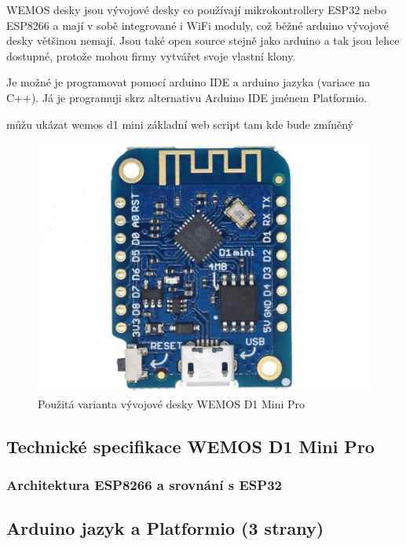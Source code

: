 \oldtext

WEMOS desky jsou vývojové desky co používají mikrokontrollery ESP32 nebo ESP8266 a mají v sobě integrované i WiFi moduly, což běžné arduino vývojové desky většinou nemají. Jsou také open source stejně jako arduino a tak jsou lehce dostupné, protože mohou firmy vytvářet svoje vlastní klony.

Je možné je programovat pomocí arduino IDE a arduino jazyka (variace na C++). Já je programuji skrz alternativu Arduino IDE jménem Platformio.

můžu ukázat wemos d1 mini základní web script tam kde bude zmíněný \cite{NavodNaESPWebServerDratek}


\begin{figure}[H]
    \centering
    \includegraphics[width=0.5\linewidth]{images/WEMOS_D1_Mini_Pro.jpg}
    \caption{Použitá varianta vývojové desky WEMOS D1 Mini Pro \cite{WEMOSD1MiniPro}}
    \label{fig:WEMOSD1MiniPro}
\end{figure}

\subsection{Technické specifikace WEMOS D1 Mini Pro}

\subsubsection{Architektura ESP8266 a srovnání s ESP32}

\subsection{Arduino jazyk a Platformio (3 strany)}

